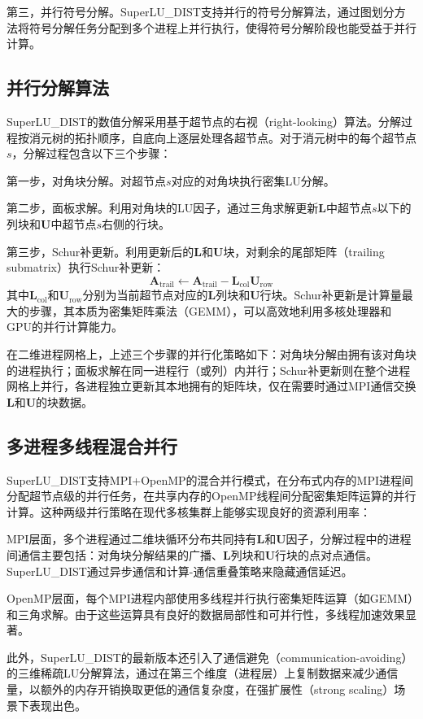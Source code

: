 第三，并行符号分解。SuperLU\_DIST支持并行的符号分解算法\cite{Grigori2007}，通过图划分方法将符号分解任务分配到多个进程上并行执行，使得符号分解阶段也能受益于并行计算。

\subsection{并行分解算法}

SuperLU\_DIST的数值分解采用基于超节点的右视（right-looking）算法。分解过程按消元树的拓扑顺序，自底向上逐层处理各超节点。对于消元树中的每个超节点$s$，分解过程包含以下三个步骤：

第一步，对角块分解。对超节点$s$对应的对角块执行密集LU分解。

第二步，面板求解。利用对角块的LU因子，通过三角求解更新$\boldsymbol{L}$中超节点$s$以下的列块和$\boldsymbol{U}$中超节点$s$右侧的行块。

第三步，Schur补更新。利用更新后的$\boldsymbol{L}$和$\boldsymbol{U}$块，对剩余的尾部矩阵（trailing submatrix）执行Schur补更新：
\begin{equation}
  \boldsymbol{A}_{\mathrm{trail}} \leftarrow \boldsymbol{A}_{\mathrm{trail}} - \boldsymbol{L}_{\mathrm{col}} \boldsymbol{U}_{\mathrm{row}}
  \label{eq:schur_update}
\end{equation}
其中$\boldsymbol{L}_{\mathrm{col}}$和$\boldsymbol{U}_{\mathrm{row}}$分别为当前超节点对应的$\boldsymbol{L}$列块和$\boldsymbol{U}$行块。Schur补更新是计算量最大的步骤，其本质为密集矩阵乘法（GEMM），可以高效地利用多核处理器和GPU的并行计算能力。

在二维进程网格上，上述三个步骤的并行化策略如下：对角块分解由拥有该对角块的进程执行；面板求解在同一进程行（或列）内并行；Schur补更新则在整个进程网格上并行，各进程独立更新其本地拥有的矩阵块，仅在需要时通过MPI通信交换$\boldsymbol{L}$和$\boldsymbol{U}$的块数据。

\subsection{多进程多线程混合并行}

SuperLU\_DIST支持MPI+OpenMP的混合并行模式，在分布式内存的MPI进程间分配超节点级的并行任务，在共享内存的OpenMP线程间分配密集矩阵运算的并行计算\cite{Liu2023}。这种两级并行策略在现代多核集群上能够实现良好的资源利用率：

MPI层面，多个进程通过二维块循环分布共同持有$\boldsymbol{L}$和$\boldsymbol{U}$因子，分解过程中的进程间通信主要包括：对角块分解结果的广播、$\boldsymbol{L}$列块和$\boldsymbol{U}$行块的点对点通信。SuperLU\_DIST通过异步通信和计算-通信重叠策略来隐藏通信延迟。

OpenMP层面，每个MPI进程内部使用多线程并行执行密集矩阵运算（如GEMM）和三角求解。由于这些运算具有良好的数据局部性和可并行性，多线程加速效果显著。

此外，SuperLU\_DIST的最新版本还引入了通信避免（communication-avoiding）的三维稀疏LU分解算法\cite{Liu2023}，通过在第三个维度（进程层）上复制数据来减少通信量，以额外的内存开销换取更低的通信复杂度，在强扩展性（strong scaling）场景下表现出色。